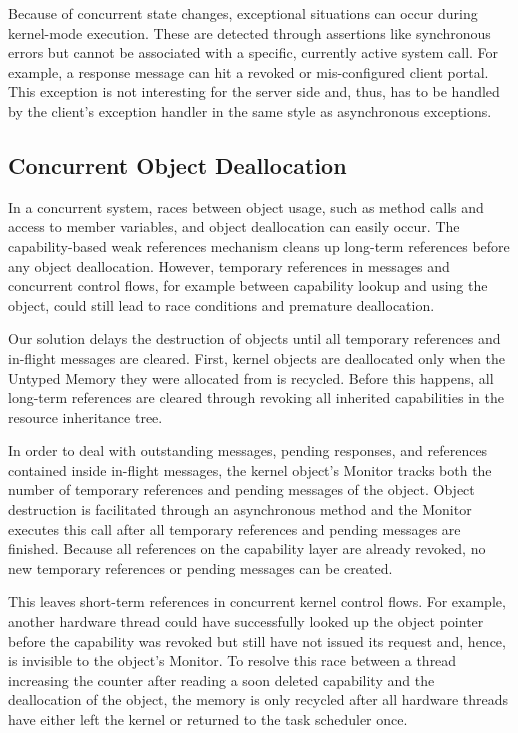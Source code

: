 Because of concurrent state changes, exceptional situations can occur during kernel-mode execution. These are detected through assertions like synchronous errors but cannot be associated with a specific, currently active system call. For example, a response message can hit a revoked or mis-configured client portal. This exception is not interesting for the server side and, thus, has to be handled by the client's exception handler in the same style as asynchronous exceptions.

\subsection{Concurrent Object Deallocation}
\label{sec:async-deletion-dyn}

In a concurrent system, races between object usage, such as method calls and access to member variables, and object deallocation can easily occur.
The capability-based weak references mechanism cleans up long-term references before any object deallocation. However, temporary references in messages and concurrent control flows, for example between capability lookup and using the object, could still lead to race conditions and premature deallocation.

Our solution delays the destruction of objects until all temporary references and in-flight messages are cleared. First, kernel objects are deallocated only when the Untyped Memory they were allocated from is recycled. Before this happens, all long-term references are cleared through revoking all inherited capabilities in the resource inheritance tree.

In order to deal with outstanding messages, pending responses, and references contained inside in-flight messages, the kernel object's Monitor
tracks both the number of temporary references and pending messages of the object. Object destruction is facilitated through an asynchronous method and the Monitor executes this call after all temporary references and pending messages are finished. Because all references on the capability layer are already revoked, no new temporary references or pending messages can be created.

This leaves short-term references in concurrent kernel control flows. For example, another hardware thread could have successfully looked up the object pointer before the capability was revoked but still have not issued its request and, hence, is invisible to the object's Monitor. To resolve this race between a thread increasing the counter after reading a soon deleted capability and the deallocation of the object, the memory is only recycled after all hardware threads have either left the kernel or returned to the task scheduler once.

